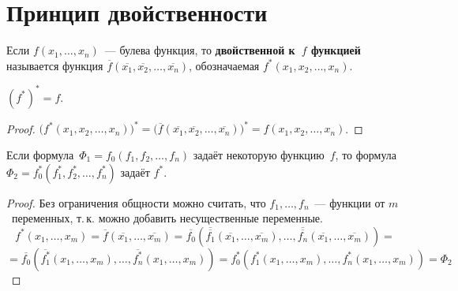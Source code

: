\section{Принцип двойственности}
 Если $f(x_1, \ldots, x_n)$~--- булева функция, то \textbf{двойственной к~$f$ функцией} называется функция $\overline f(\overline{x_1}, \overline{x_2}, \ldots, \overline{x_n})$, обозначаемая $f^*(x_1, x_2, \ldots, x_n)$.

\begin{statement}
$(f^*)^* = f$.
\end{statement}
\begin{proof}
$\bigl( f^*(x_1, x_2, \ldots, x_n) \bigr)^* =
\bigl( \overline f(\overline{x_1}, \overline{x_2}, \ldots, \overline{x_n}) \bigr)^* =
f(x_1, x_2, \ldots, x_n)$.
\end{proof}

\begin{theorem}
Если формула~$\Phi_1 = f_0(f_1, f_2, \ldots, f_n)$ задаёт некоторую функцию~$f$, то формула~$\Phi_2 = f_0^*(f_1^*, f_2^*, \ldots, f_n^*)$ задаёт $f^*$.
\end{theorem}
\begin{proof}
Без ограничения общности можно считать, что $f_1, \ldots, f_n$~--- функции от $m$~переменных, т.\,к. можно добавить несущественные переменные.
\begin{equation*}
f^*(x_1, \ldots, x_m) =
\overline f(\overline{x_1}, \ldots, \overline{x_m}) =
\overline{f_0}(\overline{\overline{f_1}}(\overline{x_1}, \ldots, \overline{x_m}), \ldots, \overline{\overline{f_n}}(\overline{x_1}, \ldots, \overline{x_m})) =
\end{equation*}
\begin{equation*}
= \overline{f_0}(\overline{f_1^*}(x_1, \ldots, x_m), \ldots, \overline{f_n^*}(x_1, \ldots, x_m)) =
f_0^*(f_1^*(x_1, \ldots, x_m), \ldots, f_n^*(x_1, \ldots, x_m)) =
\Phi_2
\end{equation*}
\end{proof}